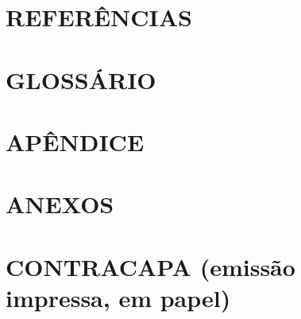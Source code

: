 \documentclass{article}
\begin{document}

\section{REFERÊNCIAS}
\newpage


\section{GLOSSÁRIO}
\newpage


\section{APÊNDICE}
\newpage


\section{ANEXOS}
\newpage


\section{CONTRACAPA (emissão impressa, em papel)}
\newpage
\end{document}
